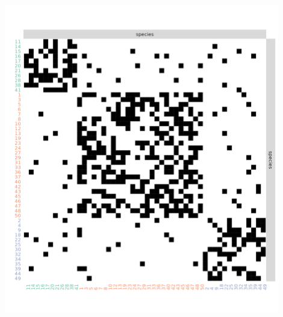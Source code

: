 \documentclass[compress,10pt]{beamer}
\begin{document}
{\begin{columns}
\begin{column}{0.5\textwidth}
\includegraphics[width=0.9\textwidth]{plots/matrix_SimuCommunities}
\end{column}
\end{columns}
}
\end{document}
